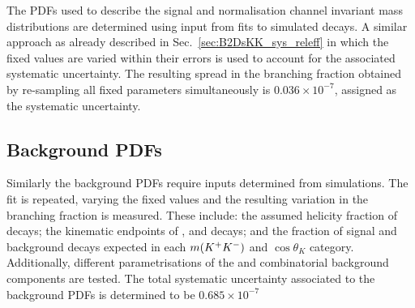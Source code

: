 The PDFs used to describe the signal and normalisation channel invariant mass distributions are determined using input from fits to simulated decays. A similar approach as already described in Sec.~\ref{sec:B2DsKK_sys_releff} in which the fixed values are varied within their errors is used to account for the associated systematic uncertainty. 
The resulting spread in the branching fraction obtained by re-sampling all fixed parameters simultaneously is $0.036\times10^{-7}$, assigned as the systematic uncertainty.

\subsection{Background PDFs}
Similarly the background PDFs require inputs determined from simulations. The fit is repeated, varying the fixed values and the resulting variation in the branching fraction is measured.
These include: the assumed helicity fraction of \decay{\Bp}{\Dssp\phiz} decays; the kinematic endpoints of \decay{\Bp}{\Dssp\phiz}, \decay{\Bp}{\Dssp\Dzb} and \decay{\Bp}{\Dsp\Dstarzb} decays; and the fraction of signal and background decays expected in each $m({{K}^+}{{K}^-})$ and $\cos{\theta_{K}}$ category.
Additionally, different parametrisations of the \decay{\Bp}{\Dssp\Dstarzb} and combinatorial background components are tested.
The total systematic uncertainty associated to the background PDFs is determined to be $0.685\times 10^{-7}$



